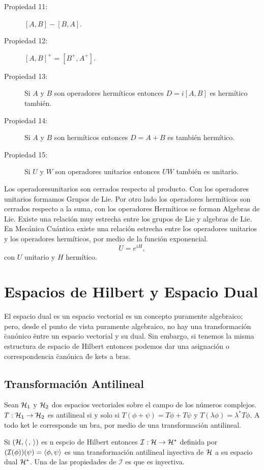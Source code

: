 \begin{description}
	\item[Propiedad 11: ] $[A,B] - [B,A]$.
	\item[Propiedad 12: ] $[A,B]^+ = [B^+,A^+]$.
	\item[Propiedad 13: ] Si $A$ y $B$ son operadores hermíticos entonces $D = i[A,B]$ es hermítico también.
	\item[Propiedad 14: ] Si $A$ y $B$ son hermíticos entonces $D = A + B$ es también hermítico.
	\item[Propiedad 15: ] Si $U$ y $W$ son operadores unitarios entonces $UW$ también es unitario.
\end{description}

Los operadoresunitarios son cerrados respecto al producto. Con los operadores unitarios formamos Grupos de Lie. Por otro lado los operadores hermíticos son cerrados respecto a la suma, con los operadores Hermíticos se forman Algebras de Lie. Existe una relación muy estrecha entre los grupos de Lie y algebras de Lie. En Mecánica Cuántica existe una relación estrecha entre los operadores unitarios y los operadores hermíticos, por medio de la función exponencial.
	$$ U = e^{iH}, $$
con $U$ unitario y $H$ hermítico.


\section{Espacios de Hilbert y Espacio Dual}
El espacio dual es un espacio vectorial es un concepto puramente algebraico; pero, desde el punto de vista puramente algebraico, no hay una transformación \"canónico \" entre un espacio vectorial y su dual. Sin embargo, si tenemos la misma estructura de espacio de Hilbert entonces podemos dar una asignación o correspondencia \" canónica \" de kets a bras.

\subsection{Transformación Antilineal}
Sean  $\mathcal{H} _1$ y $\mathcal{H} _2$ dos espacios vectoriales sobre el campo de los números complejos. $T:\mathcal{H} _1 \to \mathcal{H} _2$ es antilineal si y solo si $T(\phi + \psi) = T\phi + T\psi$ y $T(\lambda \phi) = \lambda ^* T\phi$. A todo ket le corresponde un bra, por medio de una transformación antilineal.

\begin{teorema}
	Si $(\mathcal{H} ,\langle \, , \, \rangle)$ es n espcio de Hilbert entonces $\mathcal{I} : \mathcal{H} \to \mathcal{H} ^*$ definida por $\qty(\mathcal{I} (\phi)) (\psi) = \langle \phi , \psi \rangle$ es una transformación antilineal inyectiva de $\mathcal{H}$ a su espacio dual $\mathcal{H} ^*$. Una de las propiedades de $\mathcal{I}$ es que es inyectiva.
\end{teorema}

